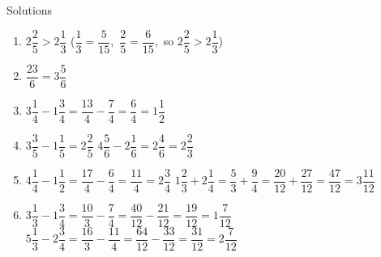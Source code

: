 \documentclass{beamer}
\begin{document}
\begin{frame}{Solutions}
\vspace{-1em}
\small
\begin{enumerate}
  \item $2\dfrac{2}{5} > 2\dfrac{1}{3}$ \quad
  ($\dfrac{1}{3} = \dfrac{5}{15}$,\ $\dfrac{2}{5} = \dfrac{6}{15}$,\ so $2\dfrac{2}{5} > 2\dfrac{1}{3}$)

  \item $\dfrac{23}{6} = 3\dfrac{5}{6}$

  \item $3\dfrac{1}{4} - 1\dfrac{3}{4} = \dfrac{13}{4} - \dfrac{7}{4} = \dfrac{6}{4} = 1\dfrac{1}{2}$

  \item $3\dfrac{3}{5} - 1\dfrac{1}{5} = 2\dfrac{2}{5}$
  \hfill
  $4\dfrac{5}{6} - 2\dfrac{1}{6} = 2\dfrac{4}{6} = 2\dfrac{2}{3}$

  \item $4\dfrac{1}{4} - 1\dfrac{1}{2} = \dfrac{17}{4} - \dfrac{6}{4} = \dfrac{11}{4} = 2\dfrac{3}{4}$
  \hfill
  $1\dfrac{2}{3} + 2\dfrac{1}{4} = \dfrac{5}{3} + \dfrac{9}{4} = \dfrac{20}{12} + \dfrac{27}{12} = \dfrac{47}{12} = 3\dfrac{11}{12}$

  \item $3\dfrac{1}{3} - 1\dfrac{3}{4} = \dfrac{10}{3} - \dfrac{7}{4} = \dfrac{40}{12} - \dfrac{21}{12} = \dfrac{19}{12} = 1\dfrac{7}{12}$
  \hfill
  $5\dfrac{1}{3} - 2\dfrac{3}{4} = \dfrac{16}{3} - \dfrac{11}{4} = \dfrac{64}{12} - \dfrac{33}{12} = \dfrac{31}{12} = 2\dfrac{7}{12}$
\end{enumerate}
\end{frame}
\end{document}
